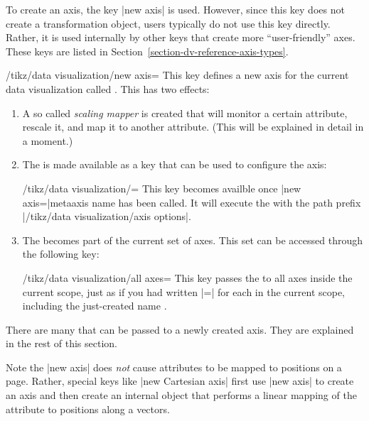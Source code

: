 To create an axis, the key |new axis| is used. However, since this key
does not create a transformation object, users typically do not use
this key directly. Rather, it is used internally by other keys
that create more ``user-friendly'' axes. These keys are listed in
Section~\ref{section-dv-reference-axis-types}. 

\begin{key}{/tikz/data visualization/new axis=}
  This key defines a new axis for the current data visualization
  called . This has two effects:
  \begin{enumerate}
  \item A so called \emph{scaling mapper} is created that will monitor
    a certain attribute, rescale it, and map it to another
    attribute. (This will be explained in detail in a moment.)
  \item The  is made available as a key that can be
    used to configure the axis:
    \begin{key}{/tikz/data visualization/=}
      This key becomes availble once |new axis=|meta{axis name} has
      been called. It will execute the  with the path
      prefix |/tikz/data visualization/axis options|.
\begin{codeexample}
\end{codeexample}
    \end{key}
  \item The  becomes part of the current set of
    axes. This set can be accessed through the following key:
    \begin{key}{/tikz/data visualization/all axes=}
      This key passes the  to all axes inside the
      current scope, just as if you had written |=| for each  in the
      current scope, including the just-created name .
    \end{key}
  \end{enumerate}
  There are many  that can be passed to a newly created
  axis. They are explained in the rest of this section.
\end{key}

Note the |new axis| does \emph{not} cause attributes to be mapped to
positions on a page. Rather, special keys like |new Cartesian axis|
first use |new axis| to create an axis and then create an internal
object that performs a linear mapping of the attribute to 
positions along a vectors.


